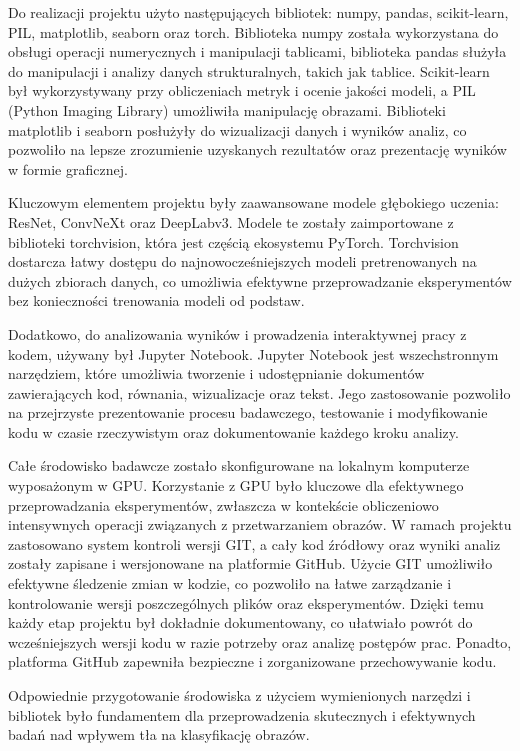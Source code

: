 Do realizacji projektu użyto następujących bibliotek: numpy, pandas, scikit-learn, PIL, matplotlib, seaborn oraz torch. 
Biblioteka numpy została wykorzystana do obsługi operacji numerycznych i manipulacji tablicami, biblioteka pandas służyła 
do manipulacji i analizy danych strukturalnych, takich jak tablice. Scikit-learn był wykorzystywany przy obliczeniach 
metryk i ocenie jakości modeli, a PIL (Python Imaging Library) umożliwiła manipulację obrazami. Biblioteki matplotlib i 
seaborn posłużyły do wizualizacji danych i wyników analiz, co pozwoliło na lepsze zrozumienie uzyskanych rezultatów oraz 
prezentację wyników w formie graficznej.

Kluczowym elementem projektu były zaawansowane modele głębokiego uczenia: ResNet, ConvNeXt oraz DeepLabv3. Modele te 
zostały zaimportowane z biblioteki torchvision, która jest częścią ekosystemu PyTorch. Torchvision dostarcza łatwy 
dostępu do najnowocześniejszych modeli pretrenowanych na dużych zbiorach danych, co umożliwia efektywne przeprowadzanie 
eksperymentów bez konieczności trenowania modeli od podstaw.

Dodatkowo, do analizowania wyników i prowadzenia interaktywnej pracy z kodem, używany był Jupyter Notebook. Jupyter 
Notebook jest wszechstronnym narzędziem, które umożliwia tworzenie i udostępnianie dokumentów zawierających kod, 
równania, wizualizacje oraz tekst. Jego zastosowanie pozwoliło na przejrzyste prezentowanie procesu badawczego, 
testowanie i modyfikowanie kodu w czasie rzeczywistym oraz dokumentowanie każdego kroku analizy.

Całe środowisko badawcze zostało skonfigurowane na lokalnym komputerze wyposażonym w GPU. Korzystanie z GPU było kluczowe
dla efektywnego przeprowadzania eksperymentów, zwłaszcza w kontekście obliczeniowo intensywnych operacji związanych z 
przetwarzaniem obrazów. W ramach projektu zastosowano system kontroli wersji GIT, a cały kod źródłowy oraz wyniki 
analiz zostały zapisane i wersjonowane na platformie GitHub. Użycie GIT umożliwiło efektywne śledzenie zmian w kodzie, 
co pozwoliło na łatwe zarządzanie i kontrolowanie wersji poszczególnych plików oraz eksperymentów. Dzięki temu każdy 
etap projektu był dokładnie dokumentowany, co ułatwiało powrót do wcześniejszych wersji kodu w razie potrzeby oraz 
analizę postępów prac. Ponadto, platforma GitHub zapewniła bezpieczne i zorganizowane przechowywanie kodu.

Odpowiednie przygotowanie środowiska z użyciem wymienionych narzędzi i bibliotek było fundamentem dla 
przeprowadzenia skutecznych i efektywnych badań nad wpływem tła na klasyfikację obrazów.

